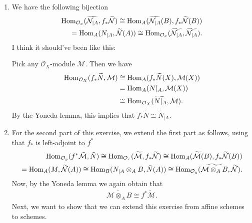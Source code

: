 \newcommand{\sheet}{7}




\maketitle{}

\begin{exercise}{1}
    \begin{enumerate}
        \item We have the following bijection
        \begin{align*}
            \operatorname{Hom}_{\mathcal{O}_x}(\widetilde{\mathcal{N}_{|A}},f_*\widetilde{\mathcal{N}})\cong
            \operatorname{Hom}_A
            (\widetilde{\mathcal{N}_{|A}}(B),f_*\widetilde{\mathcal{N}}(B))\\
            =\operatorname{Hom}_A(N_{|A},\widetilde{\mathcal{N}}(A))\cong
            \operatorname{Hom}_{\mathcal{O}_x}(\widetilde{\mathcal{N}_{|A}},\widetilde{\mathcal{N}_{|A}}).
        \end{align*}
        I think it should've been like this:

        Pick any $\mathcal{O}_X$-module $\mathcal{M}$. Then we have
        \begin{align*}
            \operatorname{Hom}_{\mathcal{O}_X} (f_* \widetilde{N}, \mathcal{M}) &\cong
            \operatorname{Hom}_A(f_* \widetilde{N}(X), \mathcal{M}(X)) \\
            &= \operatorname{Hom}_A(N|_A, \mathcal{M}(X)) \\
            &\cong \operatorname{Hom}_{\mathcal{O}_X}(\widetilde{N|_A}, \mathcal{M}).
        \end{align*}
        By the Yoneda lemma, this implies that $f_*\widetilde{N}\cong
    \tilde{N}_{|A}$. \item For the second part of this exercise, we extend the
        first part as follows, using that $f_*$ is left-adjoint to $f^*$
        \begin{align*}
            \operatorname{Hom}_{\mathcal{O}_y}(f^*\tilde{\mathcal{M}},\tilde{N})
            \cong \operatorname{Hom}_{\mathcal{O}_x}(\widetilde{\mathcal{M}},f_*\widetilde{\mathcal{N}})
            \cong \operatorname{Hom}_A (\widetilde{\mathcal{M}}(B),f_*\widetilde{\mathcal{N}}(B))\\
            = \operatorname{Hom}_A(M,\widetilde{\mathcal{N}}(A))
            \cong \operatorname{Hom}_B(N_{|A}\otimes_A B, \tilde{N}(A))
            \cong \operatorname{Hom}_{\mathcal{O}_y}(\widetilde{\mathcal{M}\otimes_A B}, \widetilde{\mathcal{N}}).
        \end{align*} 
        Now, by the Yoneda lemma we again obtain that 
        \begin{align*}
            \widetilde{\mathcal{M}\otimes_A B} 
            \cong f^*\tilde{\mathcal{M}}.
        \end{align*}
        Next, we want to show that we can extend this exercise from affine schemes to schemes.
        

\end{enumerate}
\end{exercise}

